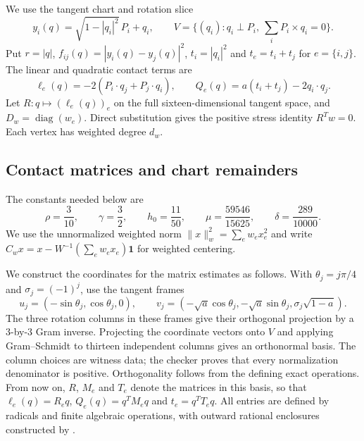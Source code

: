 \documentclass[12pt,reqno]{amsart}
\theoremstyle{definition}
\numberwithin{equation}{section}
\begin{document}
We use the tangent chart and rotation slice
\[
 y_i(q)=\sqrt{1-|q_i|^2}\,P_i+q_i,\qquad
 V=\{(q_i):q_i\perp P_i,\ \sum_iP_i\times q_i=0\}.
\]
Put $r=|q|$, $f_{ij}(q)=|y_i(q)-y_j(q)|^2$, $t_i=|q_i|^2$ and
$t_e=t_i+t_j$ for $e=\{i,j\}$. The linear and quadratic contact terms are
\[
 \ell_e(q)=-2(P_i\cdot q_j+P_j\cdot q_i),\qquad
 Q_e(q)=a(t_i+t_j)-2q_i\cdot q_j.
\]
Let $R:q\mapsto(\ell_e(q))_e$ on the full sixteen-dimensional tangent
space, and $D_w=\operatorname{diag}(w_e)$. Direct substitution gives the
positive stress identity $R^Tw=0$. Each vertex has weighted degree $d_w$.

\subsection{Contact matrices and chart remainders}
The constants needed below are
\begin{equation}\label{geo:constants}
 \rho=\frac3{10},\qquad \gamma=\frac32,\qquad h_0=\frac{11}{50},
 \qquad \mu=\frac{59546}{15625},\qquad \delta=\frac{289}{10000}.
\end{equation}
We use the unnormalized weighted norm
$\|x\|_w^2=\sum_ew_ex_e^2$ and write
$C_wx=x-W^{-1}(\sum_ew_ex_e)\mathbf1$ for weighted centering.

We construct the coordinates for the matrix estimates as follows.
With $\theta_j=j\pi/4$ and $\sigma_j=(-1)^j$, use the tangent frames
\[
 u_j=(-\sin\theta_j,\cos\theta_j,0),\qquad
 v_j=(-\sqrt a\cos\theta_j,-\sqrt a\sin\theta_j,
                           \sigma_j\sqrt{1-a}).
\]
The three rotation columns in these frames give their orthogonal
projection by a $3$-by-$3$ Gram inverse. Projecting the coordinate
vectors onto $V$ and applying Gram--Schmidt to thirteen independent
columns gives an orthonormal basis. The column choices are witness
data; the checker proves that every normalization denominator is
positive. Orthogonality follows from the defining exact operations.
From now on, $R$, $M_e$ and $T_e$ denote the matrices in this basis,
so that $\ell_e(q)=R_eq$, $Q_e(q)=q^TM_eq$ and $t_e=q^TT_eq$.
All entries are defined by radicals and finite algebraic operations,
with outward rational enclosures constructed by
.
\end{document}
